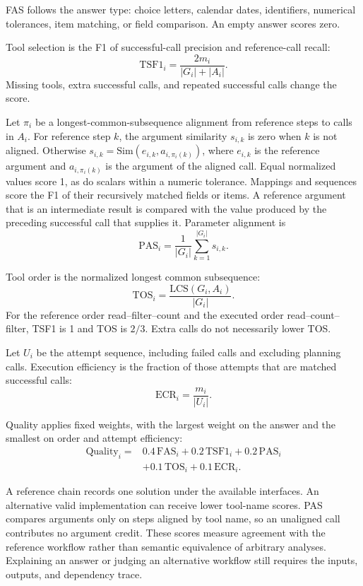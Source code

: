 FAS follows the answer type: choice letters, calendar dates, identifiers, numerical tolerances, item matching, or field comparison. An empty answer scores zero.

Tool selection is the F1 of successful-call precision and reference-call recall:
\begin{equation}
\mathrm{TSF1}_i=\frac{2m_i}{|G_i|+|A_i|}.
\label{eq:tsf1}
\end{equation}
Missing tools, extra successful calls, and repeated successful calls change the score.

Let $\pi_i$ be a longest-common-subsequence alignment from reference steps to calls in $A_i$. For reference step $k$, the argument similarity $s_{i,k}$ is zero when $k$ is not aligned. Otherwise $s_{i,k}=\mathrm{Sim}(e_{i,k},a_{i,\pi_i(k)})$, where $e_{i,k}$ is the reference argument and $a_{i,\pi_i(k)}$ is the argument of the aligned call. Equal normalized values score 1, as do scalars within a numeric tolerance. Mappings and sequences score the F1 of their recursively matched fields or items. A reference argument that is an intermediate result is compared with the value produced by the preceding successful call that supplies it. Parameter alignment is
\begin{equation}
\mathrm{PAS}_i=\frac{1}{|G_i|}\sum_{k=1}^{|G_i|}s_{i,k}.
\label{eq:pas}
\end{equation}

Tool order is the normalized longest common subsequence:
\begin{equation}
\mathrm{TOS}_i=\frac{\mathrm{LCS}(G_i,A_i)}{|G_i|}.
\label{eq:tos}
\end{equation}
For the reference order read--filter--count and the executed order read--count--filter, TSF1 is 1 and TOS is $2/3$. Extra calls do not necessarily lower TOS.

Let $U_i$ be the attempt sequence, including failed calls and excluding planning calls. Execution efficiency is the fraction of those attempts that are matched successful calls:
\begin{equation}
\mathrm{ECR}_i=\frac{m_i}{|U_i|}.
\label{eq:ecr}
\end{equation}

Quality applies fixed weights, with the largest weight on the answer and the smallest on order and attempt efficiency:
\begin{equation}
\begin{aligned}
\mathrm{Quality}_i={}&0.4\,\mathrm{FAS}_i+0.2\,\mathrm{TSF1}_i+0.2\,\mathrm{PAS}_i\\
&+0.1\,\mathrm{TOS}_i+0.1\,\mathrm{ECR}_i.
\end{aligned}
\label{eq:quality}
\end{equation}

A reference chain records one solution under the available interfaces. An alternative valid implementation can receive lower tool-name scores. PAS compares arguments only on steps aligned by tool name, so an unaligned call contributes no argument credit. These scores measure agreement with the reference workflow rather than semantic equivalence of arbitrary analyses. Explaining an answer or judging an alternative workflow still requires the inputs, outputs, and dependency trace.
